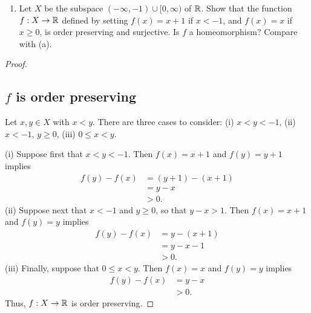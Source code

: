 \begin{solution}
  \begin{enumerate}[label={(\alph*)}, align=left, leftmargin=\parindent, listparindent=\parindent, labelwidth=0pt, itemindent=!]
    \addtocounter{enumi}{2} 
    \item 
      Let $X$ be the subspace $(-\infty, -1) \cup [0, \infty)$ of $\mathbb{R}$.
      Show that the function $f: X \rightarrow \mathbb{R}$ defined by setting $f(x) = x + 1$ if $x < -1$, and $f(x) = x$ if $x \geq 0$, is order preserving and surjective.
      Is $f$ a homeomorphism?
      Compare with (a).
  \end{enumerate}
  \begin{proof}~

    \subsection*{$f$ is order preserving}
    Let $x, y \in X$ with $x < y$.
    There are three cases to consider: (i) $x < y < -1$, (ii) $x < -1$, $y \geq 0$, (iii) $0 \leq x < y$.

    (i) Suppose first that $x < y < -1$.
    Then $f(x) = x + 1$ and $f(y) = y + 1$ implies
    \begin{equation}
      \begin{aligned}
        f(y) - f(x) &= (y + 1) - (x + 1) \\
                    &= y - x \\
                    &> 0.
      \end{aligned}
    \end{equation}
    (ii) Suppose next that $x < -1$ and $y \geq 0$, so that $y - x > 1$.
    Then $f(x) = x + 1$ and $f(y) = y$ implies
    \begin{equation}
      \begin{aligned}
        f(y) - f(x) &= y - (x + 1) \\
                    &= y - x - 1 \\
                    &> 0.
      \end{aligned}
    \end{equation}
    (iii) Finally, suppose that $0 \leq x < y$.
    Then $f(x) = x$ and $f(y) = y$ implies
    \begin{equation}
      \begin{aligned}
        f(y) - f(x) &= y - x \\
                    &> 0.
      \end{aligned}
    \end{equation}
    Thus, $f: X \rightarrow \mathbb{R}$ is order preserving.


\end{proof}
\end{solution}
